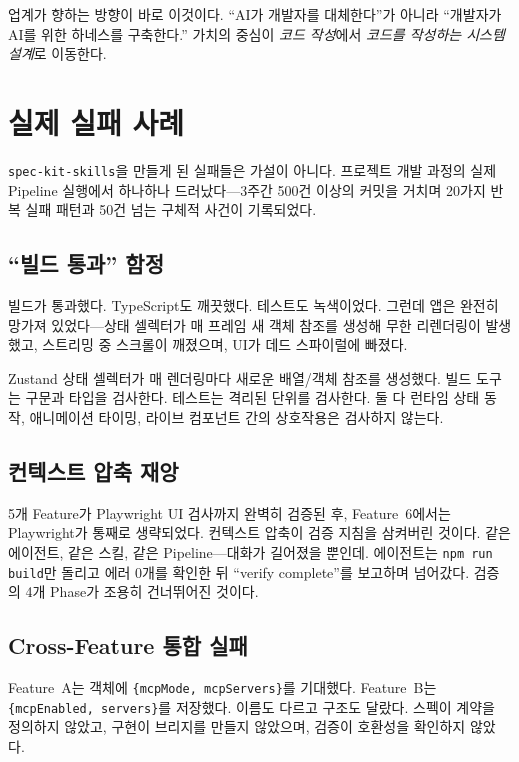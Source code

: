\documentclass[11pt,a4paper,openright,twoside]{report}
\newcommand{\speckit}{\texttt{spec-kit-skills}}
\begin{document}
업계가 향하는 방향이 바로 이것이다. ``AI가 개발자를 대체한다''가 아니라 ``개발자가 AI를 위한 하네스를 구축한다.'' 가치의 중심이 \emph{코드 작성}에서 \emph{코드를 작성하는 시스템 설계}로 이동한다.

\section{실제 실패 사례}

\speckit{}을 만들게 된 실패들은 가설이 아니다. 프로젝트 개발 과정의 실제 Pipeline 실행에서 하나하나 드러났다---3주간 500건 이상의 커밋을 거치며 20가지 반복 실패 패턴과 50건 넘는 구체적 사건이 기록되었다.

\subsection{``빌드 통과'' 함정}

빌드가 통과했다. TypeScript도 깨끗했다. 테스트도 녹색이었다. 그런데 앱은 완전히 망가져 있었다---상태 셀렉터가 매 프레임 새 객체 참조를 생성해 무한 리렌더링이 발생했고, 스트리밍 중 스크롤이 깨졌으며, UI가 데드 스파이럴에 빠졌다.

Zustand 상태 셀렉터가 매 렌더링마다 새로운 배열/객체 참조를 생성했다. 빌드 도구는 구문과 타입을 검사한다. 테스트는 격리된 단위를 검사한다. 둘 다 런타임 상태 동작, 애니메이션 타이밍, 라이브 컴포넌트 간의 상호작용은 검사하지 않는다.

\subsection{컨텍스트 압축 재앙}

5개 Feature가 Playwright UI 검사까지 완벽히 검증된 후, Feature~6에서는 Playwright가 통째로 생략되었다. 컨텍스트 압축이 검증 지침을 삼켜버린 것이다. 같은 에이전트, 같은 스킬, 같은 Pipeline---대화가 길어졌을 뿐인데. 에이전트는 \texttt{npm run build}만 돌리고 에러 0개를 확인한 뒤 ``verify complete''를 보고하며 넘어갔다. 검증의 4개 Phase가 조용히 건너뛰어진 것이다.

\subsection{Cross-Feature 통합 실패}

Feature~A는 객체에 \texttt{\{mcpMode, mcpServers\}}를 기대했다. Feature~B는 \texttt{\{mcpEnabled, servers\}}를 저장했다. 이름도 다르고 구조도 달랐다. 스펙이 계약을 정의하지 않았고, 구현이 브리지를 만들지 않았으며, 검증이 호환성을 확인하지 않았다.
\end{document}
